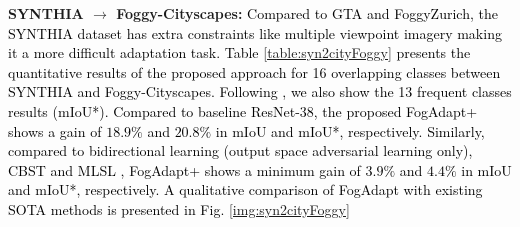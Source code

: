 \documentclass[final,5p,times,twocolumn]{elsarticle}
\begin{document}
\textbf{SYNTHIA $\rightarrow$ Foggy-Cityscapes: } 
\textcolor{black}{
Compared to GTA and FoggyZurich, the SYNTHIA dataset has extra constraints like multiple viewpoint imagery making it a more difficult adaptation task. Table \ref{table:syn2cityFoggy} presents the quantitative results of the proposed approach for 16 overlapping classes between SYNTHIA and Foggy-Cityscapes. Following \cite{ tsai2018learning, clan_2019_CVPR}, we also show the 13 frequent classes results (mIoU*). Compared to baseline ResNet-38, the proposed FogAdapt+ shows a gain of $18.9\%$ and $20.8\%$ in mIoU and mIoU*, respectively.  
Similarly, compared to bidirectional learning \cite{kim2019bidirectional} (output space adversarial learning only), CBST \cite{zou2018unsupervised} and MLSL \cite{mlsl2020}, FogAdapt+ shows a minimum gain of $3.9\%$ and $4.4\%$ in mIoU and mIoU*,  respectively.
A qualitative comparison of FogAdapt with existing SOTA methods is presented in Fig. \ref{img:syn2cityFoggy}
}
\end{document}
